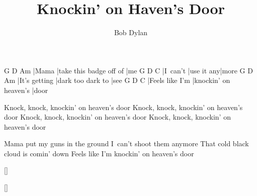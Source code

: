 \documentclass{song}
\title{Knockin' on Haven's Door}
\author{Bob Dylan}
\begin{document}
\strophe
G     D                       Am
|Mama |take this badge off of |me
G        D          C
|I~can't |use it any|more
G             D                 Am
|It's getting |dark too dark to |see
G               D                     C
|Feels like I'm |knockin' on heaven's |door
\endstrophe

Knock, knock, knockin' on heaven's door
Knock, knock, knockin' on heaven's door
Knock, knock, knockin' on heaven's door
Knock, knock, knockin' on heaven's door
\endstrophe

\strophe*
Mama put my guns in the ground
I~can't shoot them anymore
That cold black cloud is comin' down
Feels like I'm knockin' on heaven's door
\endstrophe

\ref{}

\ref{}
\end{document}
